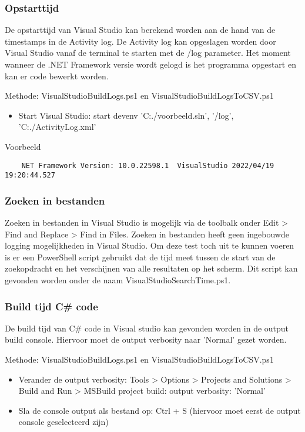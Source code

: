 \subsubsection{Opstarttijd}
De opstarttijd van Visual Studio kan berekend worden aan de hand van de timestamps in de Activity log. De Activity log kan opgeslagen worden door Visual Studio vanaf de terminal te starten met de /log parameter. Het moment wanneer de .NET Framework versie wordt gelogd is het programma opgestart en kan er code bewerkt worden.

Methode: VisualStudioBuildLogs.ps1 en VisualStudioBuildLogsToCSV.ps1
\begin{itemize}
	\item Start Visual Studio: start devenv 'C:./voorbeeld.sln', '/log', 'C:./ActivityLog.xml'
\end{itemize}

Voorbeeld
\vspace{\verbatimOffset}
\begin{verbatim}
    NET Framework Version: 10.0.22598.1	 VisualStudio 2022/04/19 19:20:44.527
\end{verbatim}

\subsubsection{Zoeken in bestanden}
Zoeken in bestanden in Visual Studio is mogelijk via de toolbalk onder Edit > Find and Replace > Find in Files. Zoeken in bestanden heeft geen ingebouwde logging mogelijkheden in Visual Studio. Om deze test toch uit te kunnen voeren is er een PowerShell script gebruikt dat de tijd meet tussen de start van de zoekopdracht en het verschijnen van alle resultaten op het scherm. Dit script kan gevonden worden onder de naam VisualStudioSearchTime.ps1.

\subsubsection{Build tijd C\# code}
De build tijd van C\# code in Visual studio kan gevonden worden in de output build console. Hiervoor moet de output verbosity naar 'Normal' gezet worden.

Methode: VisualStudioBuildLogs.ps1 en VisualStudioBuildLogsToCSV.ps1
\begin{itemize}
	\item Verander de output verbosity: Tools > Options > Projects and Solutions > Build and Run > MSBuild project build: output verbosity: 'Normal'
	\item Sla de console output als bestand op: Ctrl + S (hiervoor moet eerst de output console geselecteerd zijn)
\end{itemize}

